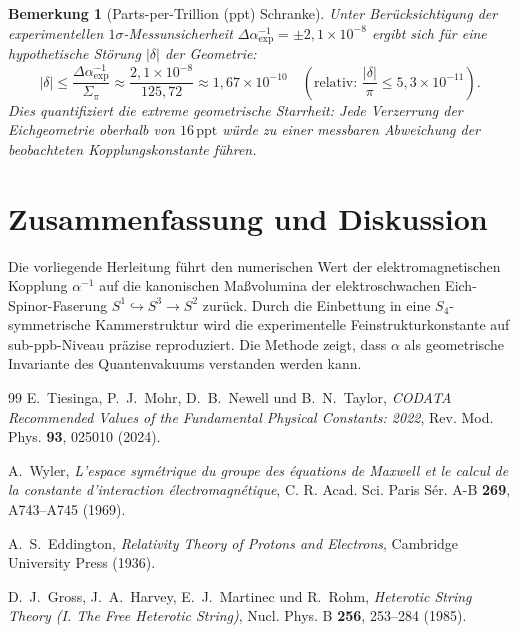 \documentclass[11pt,a4paper]{article}
\newtheorem{remark}[theorem]{Bemerkung}
\begin{document}
\begin{remark}[Parts-per-Trillion (ppt) Schranke]
Unter Berücksichtigung der experimentellen $1\sigma$-Messunsicherheit $\Delta\alpha^{-1}_{\text{exp}} = \pm 2{,}1 \times 10^{-8}$ ergibt sich für eine hypothetische Störung $|\delta|$ der Geometrie:
\begin{equation}
|\delta| \le \frac{\Delta\alpha^{-1}_{\text{exp}}}{\Sigma_\pi} \approx \frac{2{,}1 \times 10^{-8}}{125{,}72} \approx 1{,}67 \times 10^{-10} \quad \left(\text{relativ: } \frac{|\delta|}{\pi} \le 5{,}3 \times 10^{-11}\right).
\end{equation}
Dies quantifiziert die extreme geometrische Starrheit: Jede Verzerrung der Eichgeometrie oberhalb von $16\,\text{ppt}$ würde zu einer messbaren Abweichung der beobachteten Kopplungskonstante führen.
\end{remark}

\section{Zusammenfassung und Diskussion}
Die vorliegende Herleitung führt den numerischen Wert der elektromagnetischen Kopplung $\alpha^{-1}$ auf die kanonischen Maßvolumina der elektroschwachen Eich-Spinor-Faserung $S^1 \hookrightarrow S^3 \to S^2$ zurück. Durch die Einbettung in eine $S_4$-symmetrische Kammerstruktur wird die experimentelle Feinstrukturkonstante auf sub-ppb-Niveau präzise reproduziert. Die Methode zeigt, dass $\alpha$ als geometrische Invariante des Quantenvakuums verstanden werden kann.

\begin{thebibliography}{99}\itemsep2pt \parskip0pt 
E.~Tiesinga, P.~J.~Mohr, D.~B.~Newell und B.~N.~Taylor,
\textit{CODATA Recommended Values of the Fundamental Physical Constants: 2022},
Rev. Mod. Phys. \textbf{93}, 025010 (2024).

A.~Wyler,
\textit{L'espace symétrique du groupe des équations de Maxwell et le calcul de la constante d'interaction électromagnétique},
C. R. Acad. Sci. Paris Sér. A-B \textbf{269}, A743--A745 (1969).

A.~S.~Eddington,
\textit{Relativity Theory of Protons and Electrons},
Cambridge University Press (1936).

D.~J.~Gross, J.~A.~Harvey, E.~J.~Martinec und R.~Rohm,
\textit{Heterotic String Theory (I. The Free Heterotic String)},
Nucl. Phys. B \textbf{256}, 253--284 (1985).
\end{thebibliography}
\end{document}
